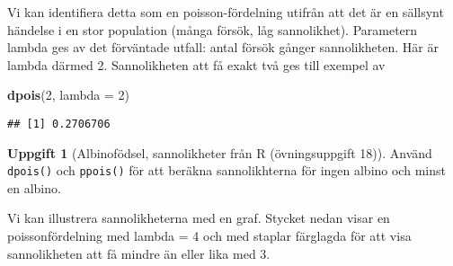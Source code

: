 \documentclass[
]{book}
\newenvironment{Shaded}{\begin{snugshade}}{\end{snugshade}}
\newcommand{\AttributeTok}[1]{\textcolor[rgb]{0.13,0.29,0.53}{#1}}
\newcommand{\DecValTok}[1]{\textcolor[rgb]{0.00,0.00,0.81}{#1}}
\newcommand{\FunctionTok}[1]{\textcolor[rgb]{0.13,0.29,0.53}{\textbf{#1}}}
\newcommand{\NormalTok}[1]{#1}
\theoremstyle{definition}
\theoremstyle{definition}
\theoremstyle{definition}
\newtheorem{exercise}{Uppgift}[chapter]
\theoremstyle{definition}
\theoremstyle{remark}
\begin{document}
Vi kan identifiera detta som en poisson-fördelning utifrån att det är en sällsynt händelse i en stor population (många försök, låg sannolikhet).
Parametern lambda ges av det förväntade utfall: antal försök gånger sannolikheten. Här är lambda därmed 2. Sannolikheten att få exakt två ges till exempel av

\begin{Shaded}
\begin{Highlighting}[]
\FunctionTok{dpois}\NormalTok{(}\DecValTok{2}\NormalTok{, }\AttributeTok{lambda =} \DecValTok{2}\NormalTok{)}
\end{Highlighting}
\end{Shaded}

\begin{verbatim}
## [1] 0.2706706
\end{verbatim}

\begin{exercise}[Albinofödsel, sannolikheter från R (övningsuppgift 18)]
Använd \texttt{dpois()} och \texttt{ppois()} för att beräkna sannolikhterna för ingen albino och minst en albino.
\end{exercise}

Vi kan illustrera sannolikheterna med en graf. Stycket nedan visar en poissonfördelning med lambda = 4 och med staplar färglagda för att visa sannolikheten att få mindre än eller lika med 3.
\end{document}
